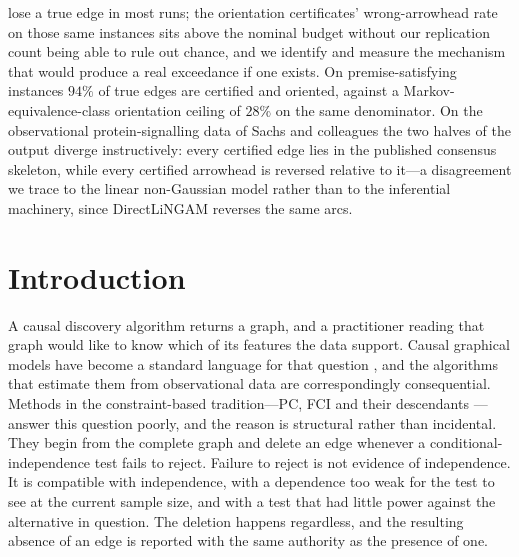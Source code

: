 \documentclass[pdflatex,sn-apa]{sn-jnl}
\theoremstyle{thmstyleone}%
\theoremstyle{thmstyletwo}%
\theoremstyle{thmstylethree}%
\begin{document}
{lose a true edge in most runs; the orientation certificates' wrong-arrowhead
rate on those same instances sits above the nominal budget without our
replication count being able to rule out chance, and we identify and measure
the mechanism that would produce a real exceedance if one exists. On
premise-satisfying
instances $94\%$ of true edges are certified and oriented, against a
Markov-equivalence-class orientation ceiling of $28\%$ on the same
denominator. On the observational
protein-signalling data of Sachs and colleagues the two halves of the output
diverge instructively: every certified edge lies in the published consensus
skeleton, while every certified arrowhead is reversed relative to it---a
disagreement we trace to the linear non-Gaussian model rather than to the
inferential machinery, since DirectLiNGAM reverses the same arcs.}



\maketitle

\section{Introduction}\label{sec:intro}

A causal discovery algorithm returns a graph, and a practitioner reading that
graph would like to know which of its features the data support. Causal
graphical models have become a standard language for that question
\citep{pearl2009causality,peters2017elements}, and the algorithms that
estimate them from observational data are correspondingly consequential. Methods in
the constraint-based tradition---PC, FCI and their descendants
\citep{spirtes2000causation,spirtes1995causal,colombo2012learning}---answer this question
poorly, and the reason is structural rather than incidental. They begin from
the complete graph and delete an edge whenever a conditional-independence test
fails to reject. Failure to reject is not evidence of independence. It is
compatible with independence, with a dependence too weak for the test to see
at the current sample size, and with a test that had little power against the
alternative in question. The deletion happens regardless, and the resulting
absence of an edge is reported with the same authority as the presence of one.
\end{document}
